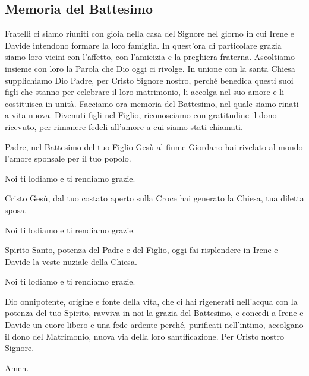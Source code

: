 
\subsection*{Memoria del Battesimo}

\begin{dialoghi}
	\item[\sacerdote] Fratelli ci siamo riuniti con gioia nella casa del Signore nel giorno in cui Irene e Davide intendono formare la loro famiglia. In quest'ora di particolare grazia siamo loro vicini con l'affetto, con l'amicizia e la preghiera fraterna. Ascoltiamo insieme con loro la Parola che Dio oggi ci rivolge. In unione con la santa Chiesa supplichiamo Dio Padre, per Cristo Signore nostro, perché benedica questi suoi figli che stanno per celebrare il loro matrimonio, li accolga nel suo amore e li costituisca in unità. Facciamo ora memoria del Battesimo, nel quale siamo rinati a vita nuova. Divenuti figli nel Figlio, riconosciamo con gratitudine il dono ricevuto, per rimanere fedeli all'amore a cui siamo stati chiamati.

	Padre, nel Battesimo del tuo Figlio Gesù al fiume Giordano hai rivelato al mondo l'amore sponsale per il tuo popolo.
	\item[\tutti] Noi ti lodiamo e ti rendiamo grazie.
	\item[\sacerdote] Cristo Gesù, dal tuo costato aperto sulla Croce hai generato la Chiesa, tua diletta sposa.
	\item[\tutti] Noi ti lodiamo e ti rendiamo grazie.
	\item[\sacerdote] Spirito Santo, potenza del Padre e del Figlio, oggi fai risplendere in Irene e Davide la veste nuziale della Chiesa.
	\item[\tutti] Noi ti lodiamo e ti rendiamo grazie.
	\item[\sacerdote] Dio onnipotente, origine e fonte della vita, che ci hai rigenerati nell'acqua con la potenza del tuo Spirito, ravviva in noi la grazia del Battesimo, e concedi a Irene e Davide un cuore libero e una fede ardente perché, purificati nell'intimo, accolgano il dono del Matrimonio, nuova via della loro santificazione. Per Cristo nostro Signore.
	\item[\tutti] Amen.
\end{dialoghi}

\newpage